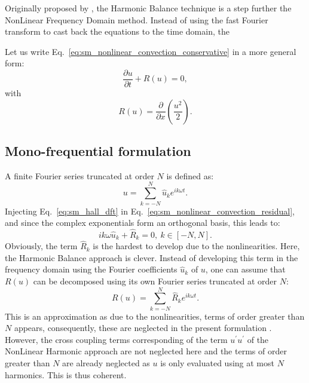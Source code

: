 
Originally proposed by \citet{Hall2002}, the Harmonic Balance technique
is a step further the NonLinear Frequency Domain method. Instead
of using the fast Fourier transform to cast back the equations
to the time domain, the 

Let us write Eq.~\ref{eq:sm_nonlinear_convection_conservative} 
in a more general form:
\begin{equation}
	\frac{\partial u}{\partial t} + R (u) = 0,
	\label{eq:sm_nonlinear_convection_residual}
\end{equation}
with
\begin{equation}
	R(u) = \frac{\partial}{\partial x} \left( 
	\frac{u^2}{2} \right).
\end{equation}

\subsection{Mono-frequential formulation}
A finite Fourier series truncated at order $N$ is defined as:
\begin{equation}
	u = \sum_{k=-N}^{N} 
	\widehat{u}_k e^{i k \omega t}.
	\label{eq:sm_hall_dft}
\end{equation}
Injecting Eq.~\ref{eq:sm_hall_dft} in 
Eq.~\ref{eq:sm_nonlinear_convection_residual}, and since
the complex exponentials form an orthogonal basis, 
this leads to:
\begin{equation}
	i k \omega \widehat{u}_k + \widehat{R}_k = 0, \: k \in [-N, N].
	\label{eq:sm_hall_frequential_eq}
\end{equation}
Obviously, the term $\widehat{R}_k$ is the hardest to develop
due to the nonlinearities. Here, the Harmonic Balance approach
is clever. 
Instead of developing this term in the frequency domain
using the Fourier coefficients $\widehat{u}_k$ of $u$,
one can assume that $R(u)$ can be decomposed using its own Fourier series
truncated at order $N$:
\begin{equation}
	R(u) = \sum_{k=-N}^{N} 
	\widehat{R}_k e^{i k \omega t}.
\end{equation}
This is an approximation as due to the nonlinearities, 
terms of order greater than $N$ appears, consequently, 
these are neglected in the present
formulation . However, the cross coupling terms corresponding
of the term $u^\prime u^\prime$ of the NonLinear Harmonic 
approach are not neglected here and
the terms of order greater
than $N$ are already neglected as $u$ is only evaluated using 
at most $N$ harmonics. This is thus coherent.

